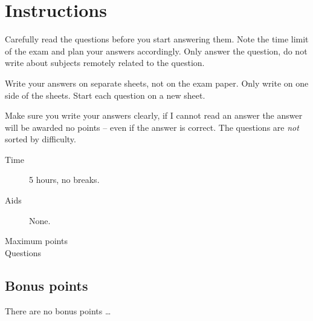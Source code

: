 \documentclass[a4paper,addpoints]{miunexam}
\date{2011-10-21}
\author{%
	Lennart Franked\\
  {\small\em E-post:} \texttt{\small lennart.franked@miun.se}\\
	{\small\em Telefon: 060-14\,xxxx}
	\and
	Daniel Bosk\\
  {\small\em E-post:} \texttt{\small daniel.bosk@miun.se}\\
	{\small\em Telefon: 060-14\,8709}
	\and
	Ulf Jennehag\\
  {\small\em E-post:} \texttt{\small ulf.jennehag@miun.se}\\
	{\small\em Telefon: 060-14\,xxxx}
	\and
	Martin Kjellqvist\\
  {\small\em E-post:} \texttt{\small martin.kjellqvist@miun.se}\\
	{\small\em Telefon: 060-14\,xxxx}
}
\begin{document}
\lstset{style=code,language=python}

\maketitle
\thispagestyle{foot}

\section*{Instructions}
\label{sec:Instructions}
Carefully read the questions before you start answering them.
Note the time limit of the exam and plan your answers accordingly.
Only answer the question, do not write about subjects remotely related to the
question.

Write your answers on separate sheets, not on the exam paper.
Only write on one side of the sheets.
Start each question on a new sheet.

Make sure you write your answers clearly, if I cannot read an answer the answer
will be awarded no points -- even if the answer is correct.
The questions are \emph{not} sorted by difficulty.

\begin{description}
	\item[Time] 5 hours, no breaks.
	\item[Aids] None.
	\item[Maximum points] \numpoints
	\item[Questions] \numquestions
\end{description}

\subsection*{Bonus points}
There are no bonus points \dots
\end{document}

